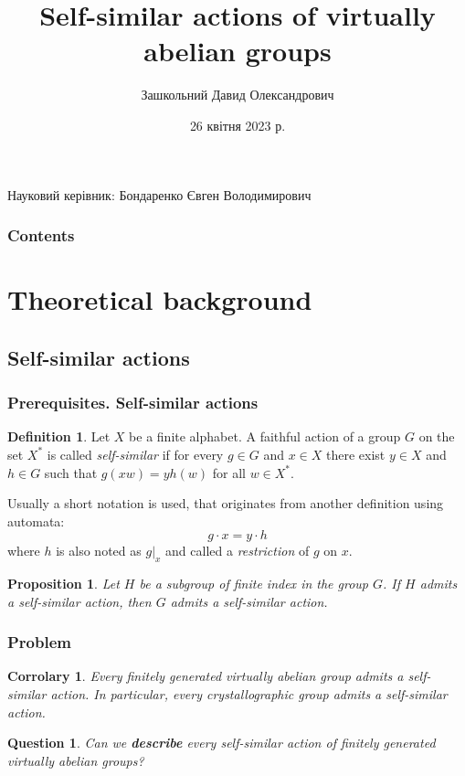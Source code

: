 \documentclass[notheorems,handout,san serif,hyperref={unicode}]{beamer} %
\title{\Large\textbf{Self-similar actions of virtually abelian groups}\vspace{-0.5cm}}
\author{Зашкольний Давид Олександрович\vspace{-0.7cm}}
\date{26 квітня 2023 р.}
\newtheorem{proposition}[theorem]{Proposition}
\newtheorem{corollary}[theorem]{Corrolary}
\newtheorem{question}{Question}
\theoremstyle{definition}
\newtheorem{definition}{Definition}[section]
\begin{document}
\begin{frame}
	\titlepage
	Науковий керівник: Бондаренко Євген Володимирович
\end{frame}

\begin{frame}
	\frametitle{Contents}
	\tableofcontents
\end{frame}

\section{Theoretical background}



\subsection{Self-similar actions}

\begin{frame}
	\frametitle{Prerequisites. Self-similar actions}
	
		
	\begin{definition}
		Let $X$ be a finite alphabet. A faithful action of a group $G$ on the set $X^{*}$ is called \textit{self-similar} if for every $g\in G$ and $x\in X$ there exist $y\in X$ and $h\in G$ such that
		$g(xw)=yh(w)$ for all $w\in X^{*}$.
		
		Usually a short notation is used, that originates from another definition using automata: 
		\begin{equation} \label{eq:self-similar definition}
			g \cdot x = y \cdot h	
		\end{equation}
		where $h$ is also noted as $g|_x$ and called a \textit{restriction} of $g$ on $x$.
	\end{definition}

	\vskip 1cm
	
	\begin{proposition} \label{self-similar:subgroup}
		Let $H$ be a subgroup of finite index in the group $G$. If $H$ admits a self-similar action, then $G$ admits a self-similar action.
	\end{proposition}
	
\end{frame}


\begin{frame}
	\frametitle{Problem}
	
	
	\begin{corollary} \label{cor: self-similar actions of cryst}
		Every finitely generated virtually abelian group admits a self-similar action. In particular, every crystallographic group admits a self-similar action.
	\end{corollary}
	
	\vskip 2cm
	
	\begin{question}
		Can we \textbf{describe} every self-similar action of finitely generated virtually abelian groups?
	\end{question}
	
\end{frame}
\end{document}
